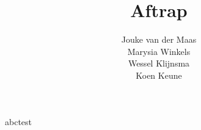 \documentclass[11pt,a4paper]{article}
\begin{document}
\author{Jouke van der Maas\\
Marysia Winkels\\
Wessel Klijnsma\\
Koen Keune}
\title{Aftrap}

\maketitle

abctest
\end{document}
